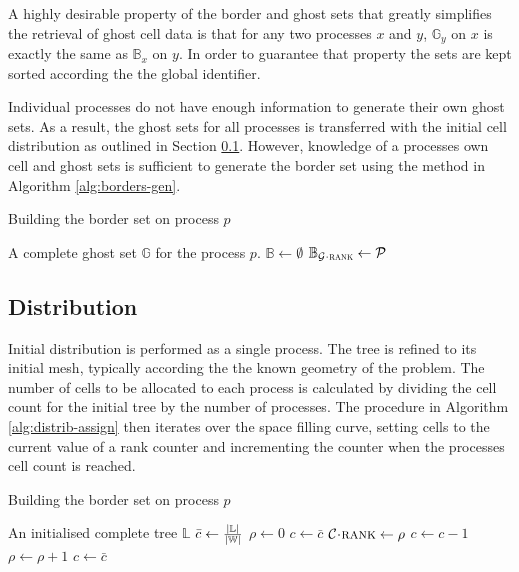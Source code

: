 \documentclass{IIBproject}
\newcommand{\vect}[1]{\bm{#1}}
\newcommand{\acc}{{\mkern 0.5mu\cdot\mkern 0.5mu}}
\begin{document}
A highly desirable property of the border and ghost sets that greatly simplifies the retrieval of ghost cell data is that for any two processes $x$ and $y$, $\mathbb{G}_y$ on $x$ is exactly the same as $\mathbb{B}_x$ on $y$. In order to guarantee that property the sets are kept sorted according the the global identifier. 

Individual processes do not have enough information to generate their own ghost sets. As a result, the ghost sets for all processes is transferred with the initial cell distribution as outlined in Section \ref{sec:distribution}. However, knowledge of a processes own cell and ghost sets is sufficient to generate the border set using the method in Algorithm \ref{alg:borders-gen}.

\begin{algorithm}[H]
\caption{Building the border set on process $p$}
\label{alg:borders-gen}

\begin{algorithmic}
\Require A complete ghost set $\mathbb{G}$ for the process $p$.
\Statex
\State $\mathbb{B} \gets \emptyset$
	\ForEach {poisson neighbour $\mathcal{P} \in \mathcal{G}\acc\vect{\mathcal{P}}$}
		\If {$\mathcal{P}\acc\textproc{rank} = p$}
			\State $\mathbb{B}_{\mathcal{G}\acc\textproc{rank}} \gets \mathcal{P}$
		\EndIf
	\EndFor
\EndFor
\end{algorithmic}
\end{algorithm}


\subsection{Distribution}
\label{sec:distribution}

Initial distribution is performed as a single process. The tree is refined to its initial mesh, typically according the the known geometry of the problem. The number of cells to be allocated to each process is calculated by dividing the cell count for the initial tree by the number of processes. The procedure in Algorithm \ref{alg:distrib-assign} then iterates over the space filling curve, setting cells to the current value of a rank counter and incrementing the counter when the processes cell count is reached.

\begin{algorithm}[H]
\caption{Building the border set on process $p$}
\label{alg:distrib-assign}

\begin{algorithmic}
\Require An initialised complete tree $\mathbb{L}$
\Statex
\State $\bar{c} \gets \frac{\abs{\mathbb{L}}}{\abs{\mathbb{W}}}$ 
\State $\rho \gets 0$ 
\State $c \gets \bar c$ 
	\State $\mathcal{C}\acc\textproc{rank} \gets \rho$
	\State $c \gets c-1$
	 
		\State $\rho \gets \rho+1$
		\State $c \gets \bar c$
	\EndIf
\EndFor
\end{algorithmic}
\end{algorithm}
\end{document}
